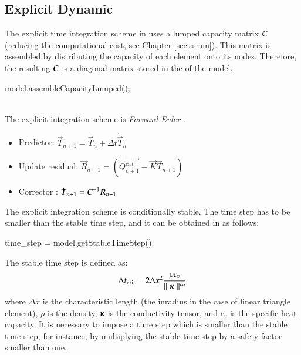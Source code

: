 \subsection{Explicit Dynamic}

The explicit  time integration scheme in \akantu  uses a lumped capacity
matrix $\boldsymbol{C}$ (reducing the computational  cost, see Chapter \ref{sect:smm}).
This matrix is assembled by
distributing the capacity of each element onto its nodes. Therefore, the resulting $\boldsymbol{C}$ is a diagonal matrix stored in the   of the model.

\begin{cpp}
  model.assembleCapacityLumped();
\end{cpp}

 \\

The explicit integration scheme is  \emph{Forward Euler}
\cite{curnier92a}.

\begin{itemize}
\item Predictor: $\vec{T}_{n+1} = \vec{T}_{n} + \Delta t \dot{\vec{T}}_{n}$
\item Update residual: $\vec{R}_{n+1} = \left( \vec{Q^{ext}_{n+1}} - \vec{K}\vec{T}_{n+1} \right)$
\item Corrector : $\dot{\boldsymbol{T}}_{n+1} = \boldsymbol{C}^{-1} \boldsymbol{R}_{n+1}$
\end{itemize}

The explicit integration scheme is conditionally stable. The time step has to be smaller than the stable time step,
and it can be obtained in \akantu as follows:

\begin{cpp}
  time_step = model.getStableTimeStep();
\end{cpp}

The stable time step is defined as:
\begin{equation}\label{eqn:htm:explicit:stabletime}
  \Delta t_{{\mathrm{crit}}} = 2 \Delta x^2 \frac{\rho c_v}{\mid\mid \boldsymbol{\kappa} \mid\mid^\infty}
\end{equation}
where $\Delta x$ is the characteristic length (\eg the inradius in the
case of linear triangle element), $\rho$ is the density,
$\boldsymbol{\kappa}$ is the conductivity tensor, and $c_v$ is the specific
heat capacity. It is necessary to impose a time step which is smaller
than the stable time step, for instance, by multiplying the stable
time step by a safety factor smaller than one.

